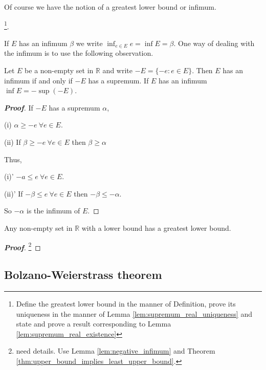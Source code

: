 Of course we have the notion of a greatest lower bound or infimum.

\begin{definition}\label{def:infimum_real}
\footnote{Define the greatest lower bound in the manner of Definition, prove its uniqueness in the manner of Lemma \ref{lem:supremum_real_uniqueness} and state and prove a result corresponding to Lemma \ref{lem:supremum_real_existence}}.
\end{definition}

If $E$ has an infimum $\beta$ we write $\inf_{e \in E} e = \inf E = \beta$. One way of dealing with the infimum is to use the following observation.

\begin{lemma}\label{lem:negative_infimum}
Let $E$ be a non-empty set in $\mathbb{R}$ and write $-E=\{-e : e \in E\}$. Then $E$ has an infimum if and only if $-E$ has a supremum. If $E$ has an infimum $\inf E = -\sup (-E)$.
\end{lemma}

\begin{proof}[\bf Proof]
If $-E$ has a supremum $\alpha$, 
\ben
\item [(i)] $\alpha \geq -e \ \forall e \in E$.
\item [(ii)] If $\beta \geq -e \ \forall e \in E$ then $\beta \geq \alpha$ 
\een
 
Thus,
\ben
\item [(i)'] $-a \leq e \ \forall e \in E$.
\item [(ii)'] If $-\beta \leq e \ \forall e \in E$ then $-\beta \leq -\alpha$.
\een

So $-\alpha$ is the infimum of $E$.
\end{proof}

\begin{theorem}\label{thm:lower_bound_implies_greatest_lower_bound}
Any non-empty set in $\mathbb{R}$ with a lower bound has a greatest lower bound.
\end{theorem}

\begin{proof}[\bf Proof]
\footnote{need details. Use Lemma \ref{lem:negative_infimum} and Theorem \ref{thm:upper_bound_implies_least_upper_bound}.}
\end{proof}



\subsection{Bolzano-Weierstrass theorem}

